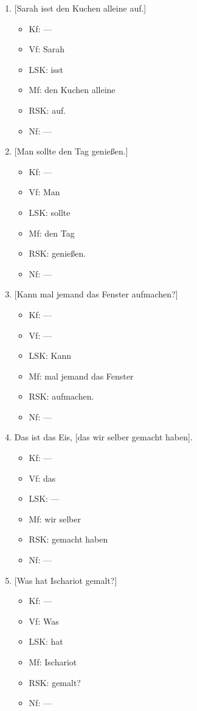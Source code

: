 \begin{enumerate}
  \item{} [Sarah isst den Kuchen alleine auf.]
    \begin{itemize}
      \item Kf: ---
      \item Vf: Sarah
      \item LSK: isst
      \item Mf: den Kuchen alleine
      \item RSK: auf.
      \item Nf: ---
    \end{itemize}
  \item{} [Man sollte den Tag genießen.]
    \begin{itemize}
      \item Kf: ---
      \item Vf: Man
      \item LSK: sollte
      \item Mf: den Tag
      \item RSK: genießen.
      \item Nf: ---
    \end{itemize}
  \item{} [Kann mal jemand das Fenster aufmachen?]
    \begin{itemize}
      \item Kf: ---
      \item Vf: ---
      \item LSK: Kann
      \item Mf: mal jemand das Fenster
      \item RSK: aufmachen.
      \item Nf: ---
    \end{itemize}
  \item Das ist das Eis, [das wir selber gemacht haben].
    \begin{itemize}
      \item Kf: ---
      \item Vf: das
      \item LSK: ---
      \item Mf: wir selber
      \item RSK: gemacht haben
      \item Nf: ---
    \end{itemize}
  \item{} [Was hat Ischariot gemalt?]
    \begin{itemize}
      \item Kf: ---
      \item Vf: Was
      \item LSK: hat
      \item Mf: Ischariot
      \item RSK: gemalt?
      \item Nf: ---
    \end{itemize}


\end{enumerate}
